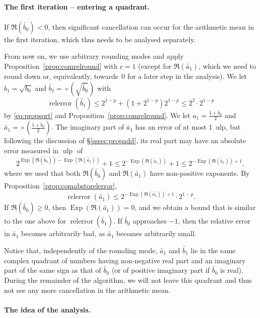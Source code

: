 \documentclass [11pt]{article}
\newcommand {\corr}[1]{{#1}}
\newcommand {\appro}[1]{\widetilde {#1}}
\newcommand {\ulp}[1]{#1~ulp}
\newcommand {\Ulp}{{\operatorname {ulp}}}
\DeclareMathOperator{\Exp}{\operatorname {Exp}}
\newcommand{\relerror}{\operatorname {relerror}}
\newcommand {\round}{\operatorname {\circ}}
\renewcommand {\leq}{\leqslant}
\renewcommand {\geq}{\geqslant}
\begin{document}
\paragraph {The first iteration -- entering a quadrant.}
If $\Re (\appro {b_0}) < 0$, then significant cancellation can occur for the
arithmetic mean in the first iteration, which thus needs to be analysed
separately.

From now on, we use arbitrary rounding modes and apply
Proposition~\ref {prop:comrelround} with $c = 1$
(except for $\Re (\appro {a_1})$, which we need to round down or,
equivalently, towards~$0$ for a later step in the analysis).
We let $\corr {b_1} = \sqrt {\corr {b_0}}$ and
$\appro {b_1} = \round \left( \sqrt {\appro {b_0}} \right)$ with
\[
\relerror (\appro {b_1}) \leq
2^{1-p} + \left( 1 + 2^{1-p} \right) 2^{1-p}
\leq 2^2 \cdot 2^{1-p}
\]
by \eqref {eq:propsqrt} and Proposition~\ref {prop:comrelround}.
We let $\corr {a_1} = \frac {1 + \corr {b_0}}{2}$ and
$\appro {a_1} = \round \left( \frac {1 + \appro {b_0}}{2} \right)$.
The imaginary part of $\appro {a_1}$ has an error of at most \ulp{1},
but following the discussion of \S\ref {sssec:propadd}, its real part
may have an absolute error measured in $\Ulp$ of
\[
2^{\Exp (\Re (\appro {b_0})) - \Exp (\Re (\appro {a_1}))} + 1
\leq
2^{- \Exp (\Re (\appro {a_1}))} + 1
\leq
2^{- \Exp (\Re (\appro {a_1})) + 1},
\]
where we used that both $\Re (\appro {b_0})$ and $\Re (\appro {a_1})$ have
non-positive exponents.
By Proposition~\ref {prop:comabstorelerror},
\[
\relerror (\appro {a_1})
\leq
2^{- \Exp (\Re (\appro {a_1})) + 1} \cdot 2^{1-p}.
\]
If $\Re (\appro {b_0}) \geq 0$, then $\Exp (\Re (\appro {a_1})) = 0$, and
we obtain a bound that is similar to the one above for
$\relerror (\appro {b_1})$. If $\appro {b_0}$ approaches $-1$, then
the relative error in $\appro {a_1}$ becomes arbitrarily bad, as
$\appro {a_1}$ becomes arbitrarily small.

Notice that, independently of the rounding mode,
$\appro {a_1}$ and $\appro {b_1}$ lie in the same complex quadrant
of numbers having non-negative real part and an imaginary part of the same
sign as that of $\appro {b_0}$
(or of positive imaginary part if $\appro {b_0}$ is real).
During the remainder of the algorithm, we will not leave this quadrant
and thus not see any more cancellation in the arithmetic mean.


\paragraph {The idea of the analysis.}
\end{document}
